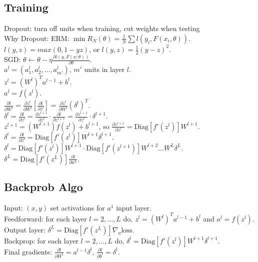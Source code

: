 \subsection*{Training}

Dropout: turn off units when training, cut weights when testing\\
Why Dropout: 
ERM: $\min R_N(\theta) = \frac{1}{N}\sum l(y_i, F(x_i, \theta))$.\\
$l(y, z) = max(0, 1-yz)$, or $l(y, z) = \frac{1}{2}(y-z)^2$.\\
SGD: $\theta \leftarrow \theta - \eta \frac{\partial l(y, F(x; \theta))}{\partial \theta}$.\\
$a^l = (a_1^l, a_2^l, \dots, a_{m'}^l)$, $m'$ units in layer $l$.\\
$z^l = (W^l)^T a^{l-1} + b^l$.\\
$a^l = f(z^l)$.\\
$\frac{\partial l}{\partial W^l} = \frac{\partial z^l}{\partial W^l}[\frac{\partial l}{\partial z^l}] = \frac{\partial z^l}{\partial W^l}(\delta^l)^T$.\\
$\delta^l = \frac{\partial l}{\partial z^l} = \frac{\partial z^{l+1}}{\partial z^l}\cdot\frac{\partial l}{\partial z^{l+1}} = \frac{\partial z^{l+1}}{\partial z^l} \cdot \delta^{l+1}$.\\
$z^{l+1} = (W^{l+1})f(z^l) + b^{l+1}$, so $\frac{\partial z^{l+1}}{\partial z^l} = \text{Diag}[f'(z^l)]W^{l+1}$.\\
$\delta^l = \frac{\partial l}{\partial z^l} = \text{Diag}[f'(z^l)]W^{l+1}\delta^{l+1}.$\\
$\delta^l = \text{Diag}[f'(z^l)]W^{l+1}\cdot\text{Diag}[f'(z^{l+1})]W^{l+2} \dots W^{L}\delta^L$.\\
$\delta^L = \text{Diag}[f'(z^L)]\frac{\partial l}{\partial a^L}$.\\

\subsection*{Backprob Algo}
Input: $(x, y)$ set activations for $a^1$ input layer.\\
Feedforward: for each layer $l=2, \dots, L$ do, $z^l = (W^l)^T a^{l-1} + b^l$ and $a^l = f(z^l)$.\\
Output layer: $\delta^L = \text{Diag}[f'(z^L)]\nabla_a \text{loss}$.\\
Backprop: for each layer $l=2, \dots, L$ do, $\delta^l = \text{Diag}[f'(z^l)]W^{l+1}\delta^{l+1}$.\\
Final gradients: $\frac{\partial l}{\partial W^l} = a^{l-1}\delta^l$, $\frac{\partial l}{\partial b^l} = \delta^l$.

